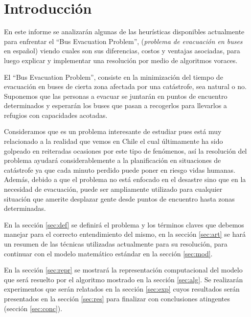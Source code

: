 \documentclass[letter, 10pt]{article}
\begin{document}
\section{Introducción}\label{sec:intro}
    En este informe se analizarán algunas de las heurísticas disponibles
    actualmente para enfrentar el ``Bus Evacuation Problem'',  (\emph{problema
    de evacuación en buses} en español) viendo cuales son sus diferencias, 
    costos y ventajas asociadas, para luego explicar y implementar una
    resolución por medio de algoritmos voraces.

    El ``Bus Evacuation Problem'', consiste en la
    minimización del tiempo de evacuación en buses de cierta zona afectada por
    una catástrofe, sea natural o no. Suponemos que las personas a evacuar se
    juntarán en puntos de encuentro determinados y esperarán los buses que pasan
    a recogerlos para llevarlos a refugios con capacidades acotadas.
    
    Consideramos que es un problema
    interesante de estudiar pues está muy relacionado a la realidad que vemos
    en Chile el cual últimamente ha sido golpeado en reiteradas ocasiones
    por este tipo de fenómenos, así la resolución del problema ayudará
    considerablemente a la planificación en situaciones de catástrofe ya que
    cada minuto perdido puede poner en riesgo vidas humanas. Además, debido a
    que el problema no está enfocado en el desastre sino que en la necesidad de
    evacuación, puede ser ampliamente utilizado para cualquier situación que
    amerite desplazar gente desde puntos de encuentro hasta zonas determinadas.

    En la sección \ref{sec:def} se definirá el problema y los términos claves
    que debemos manejar para el correcto entendimiento del mismo, en la
    sección \ref{sec:art} se hará un resumen de las técnicas utilizadas
    actualmente para su resolución, para continuar con el modelo
    matemático estándar en la sección \ref{sec:mod}.

    En la sección \ref{sec:repr} se mostrará la representación computacional del
    modelo que será resuelto por el algoritmo mostrado en la sección
    \ref{sec:alg}. Se realizarán experimentos que serán relatados en la sección
    \ref{sec:exp} cuyos resultados serán presentados en la sección \ref{sec:res}
    para finalizar con conclusiones atingentes (sección \ref{sec:conc}).
\end{document}
